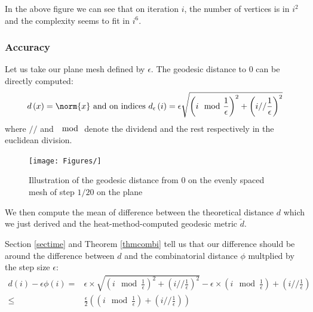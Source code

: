 \documentclass[math, info, english]{cours}
\begin{document}
In the above figure we can see that on iteration $i$, the number of vertices is in $i^{2}$ and the complexity seems to fit in $i^{6}$.

\subsubsection{Accuracy}
Let us take our plane mesh defined by $\epsilon$. The geodesic distance to $0$ can be directly computed:
\begin{equation*}
d\left( x \right) = \norm{x} \text{ and on indices } d_{\epsilon}\left( i \right) = \epsilon\sqrt{\left( i \mod \frac{1}{\epsilon} \right)^{2} + \left( i // \frac{1}{\epsilon} \right)^{2}}
\end{equation*}
where $//$ and $\mod$ denote the dividend and the rest respectively in the euclidean division.
\begin{figure}[h]
	\centering
	\texttt{[image: Figures/]}
	\caption{Illustration of the geodesic distance from $0$ on the evenly spaced mesh of step $1/20$ on the plane}
\end{figure}

We then compute the mean of difference between the theoretical distance $d$ which we just derived and the heat-method-computed geodesic metric $\tilde{d}$.

Section \ref{sectime} and Theorem \ref{thmcombi} tell us that our difference should be around the difference between $d$ and the combinatorial distance $\phi$ multplied by the step size $\epsilon$:
\begin{equation*}
	\begin{aligned}
	d\left( i \right) - \epsilon\phi\left( i \right) =& \epsilon \times
			\sqrt{\left( i \mod \frac{1}{\epsilon} \right)^{2} + \left( i // \frac{1}{\epsilon} \right)^{2} }
			-
			\epsilon \times\left( i \mod \frac{1}{\epsilon} \right) + \left(i // \frac{1}{\epsilon} \right)\\
	\leq& \frac{\epsilon}{2} \left(\left( i \mod \frac{1}{\epsilon} \right) + \left(i // \frac{1}{\epsilon} \right) \right)
	\end{aligned}
\end{equation*}
\end{document}
